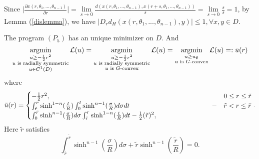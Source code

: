 \begin{proposition}\label{disprop}
	Since  $\Big|\frac{\partial x(r, \theta_1,...,\theta_{n-1})}{\partial r}\Big|= \lim\limits_{s\rightarrow 0}\frac{d( x(r, \theta_1,...,\theta_{n-1}),  x(r+s, \theta_1,...,\theta_{n-1}))}{s}=\lim\limits_{s\rightarrow 0}\frac{s}{s} = 1$,
	by Lemma (\ref{dislemma}), we have $ |D_r d_H(x(r, \theta_1,...,\theta_{n-1}), y)|\le 1, \forall x, y \in D.$
\end{proposition}
\begin{theorem}
	The program $(P_5)$ has an unique minimizer on $D$. And 
	\begin{equation*}
	\argmin\limits_{\substack{u\ge -\frac{1}{2}r^2 \\ u \text{ is radially symmetric} \\ u \in C^1(D)}} \mathcal{L}(u)= \argmin\limits_{\substack{u\ge -\frac{1}{2}r^2 \\ u \text{ is radially symmetric} \\ u \text{ is $G$-convex}}} \mathcal{L}(u)=\argmin\limits_{\substack{u\ge u_{\emptyset} \\ u \text{ is $G$-convex}}} \mathcal{L}(u) =: \bar{u}(r)
	\end{equation*}
	where
	\begin{equation*}
	\bar{u}(r) = 
	\begin{cases}
	-\frac{1}{2} r^2, & 0\le r\le \tilde{r} \\
	\parbox[t]{.8\textwidth}{$\int_{\tilde{r}}^{r}\sinh^{1-n}(\frac{t}{R})\int_{0}^{t}\sinh^{n-1}(\frac{\sigma}{R})d\sigma dt - \int_{0}^{\bar{r}}\sinh^{n-1}(\frac{\sigma }{R})d \sigma  \int_{\tilde{r}}^{r}\sinh^{1-n}(\frac{t}{R}) d t -\frac{1}{2}(\tilde{r})^2, $} & \tilde{r} < r \le \bar{r} \\
	\end{cases}.
	\end{equation*}
	Here $\tilde{r}$ satisfies 
	\begin{equation*}
	\int_{\bar{r}}^{\tilde{r}}\sinh^{n-1}(\frac{\sigma }{R}) d\sigma  +\tilde{r}\sinh^{n-1}(\frac{\tilde{r}}{R})=0.
	\end{equation*}
\end{theorem}

